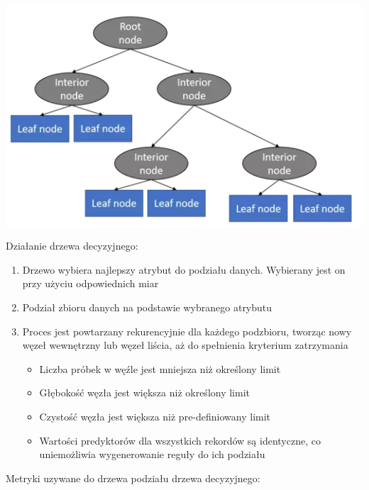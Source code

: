 \documentclass{article}
\begin{document}
 \begin{center}
    \includegraphics[scale=0.7]{images/decision_tree.png}
    \captionsetup{hypcap=false}
    \label{fig:tree}
\end{center}

Działanie drzewa decyzyjnego:

\begin{enumerate}
  \item Drzewo wybiera najlepszy atrybut do podziału danych. Wybierany jest on przy użyciu odpowiednich miar
  \item Podział zbioru danych na podstawie wybranego atrybutu
  \item Proces jest powtarzany rekurencyjnie dla każdego podzbioru, tworząc nowy węzeł wewnętrzny lub węzeł liścia, aż do spełnienia kryterium zatrzymania
    \begin{itemize}
         \item Liczba próbek w węźle jest mniejsza niż określony limit
         \item Głębokość węzła jest większa niż określony limit
         \item Czystość węzła jest większa niż pre-definiowany limit\
         \item Wartości predyktorów dla wszystkich rekordów są identyczne, co uniemożliwia wygenerowanie reguły do ich podziału
    \end{itemize}
\end{enumerate}

Metryki uzywane do drzewa podziału drzewa decyzyjnego:
\end{document}
